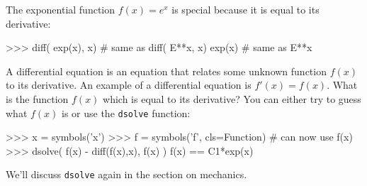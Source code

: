 \noindent
The exponential function $f(x)=e^x$ is special because it is equal to its derivative:

\small
\begin{verbatimtab}
>>> diff( exp(x), x)     # same as diff( E**x, x)
exp(x)                   # same as E**x
\end{verbatimtab}
\normalsize

\noindent
A differential equation is an equation that relates some unknown function $f(x)$ to its derivative. 
An example of a differential equation is $f'(x)=f(x)$.
What is the function $f(x)$ which is equal to its derivative?
You can either try to guess what $f(x)$ is or use the \texttt{dsolve} function:

\small
\begin{verbatimtab}
>>> x = symbols('x')
>>> f = symbols('f', cls=Function)        # can now use f(x)
>>> dsolve( f(x) - diff(f(x),x), f(x) )
f(x) == C1*exp(x)
\end{verbatimtab}
\normalsize

\noindent
We'll discuss \texttt{dsolve} again in the section on mechanics.
